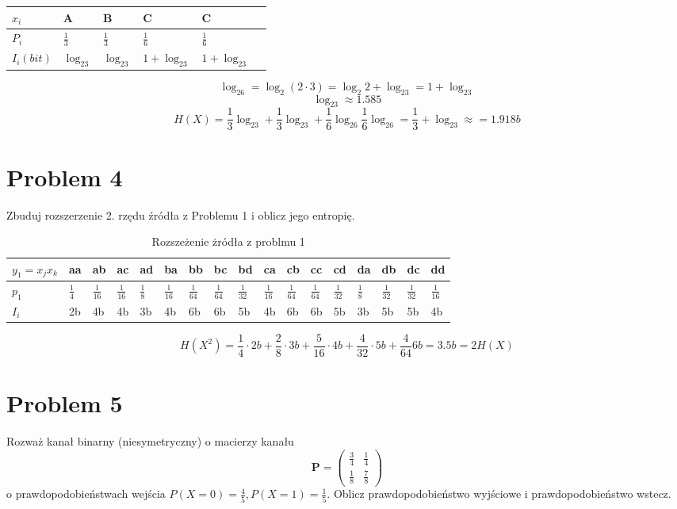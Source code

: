 \documentclass[12pt]{article}
\begin{document}
\begin{table}[h]
\begin{tabular}{l|lllll}
\hline \hline
$x_i$ & A   & B   & C   & C   \\ \hline
$P_i$ & $\frac{1}{3}$ & $\frac{1}{3}$ &$\frac{1}{6}$& $\frac{1}{6}$\\ 
$I_i(bit)$ & $\log_23$  & $\log_23$  & $1+\log_23$  & $1+\log_23$ \\  \hline \hline
\end{tabular}

\end{table}
$$\log_26 = \log_2(2\cdot 3)=\log_2 2 + \log_23 = 1 + \log_23 $$
$$\log_23 \approx 1.585 $$
$$ H(X) =\frac{1}{3}\log_23 + \frac{1}{3}\log_23 + \frac{1}{6}\log_26 \frac{1}{6}\log_26 =\frac{1}{3} + \log_23 \approx = 1.918b $$

\section*{Problem 4}

Zbuduj rozszerzenie 2. rzędu źródła z Problemu 1 i oblicz jego entropię.

\begin{table}[h]
\hspace*{-1.5cm}
\begin{tabular}{|l|l|l|l|l|l|l|l|l|l|l|l|l|l|l|l|l|}
\hline
$y_1=x_j x_k$ & aa  & ab   & ac   & ad  & ba   & bb   & bc   & bd   & ca   & cb   & cc   & cd   & da  & db   & dc   & dd   \\ \hline
    $p_1$        & $\frac{1}{4}$ & $\frac{1}{16}$ & $\frac{1}{16}$ & $\frac{1}{8}$ & $\frac{1}{16}$ & $\frac{1}{64}$ & $\frac{1}{64}$ & $\frac{1}{32}$ & $\frac{1}{16}$ & $\frac{1}{64}$ & $\frac{1}{64}$ & $\frac{1}{32}$ & $\frac{1}{8}$ & $\frac{1}{32}$ & $\frac{1}{32}$ & $\frac{1}{16}$ \\[0.4em] \hline
$I_i $     & 2b  & 4b   & 4b   & 3b  & 4b   & 6b   & 6b   & 5b   & 4b   & 6b   & 6b   & 5b   & 3b  & 5b   & 5b   & 4b   \\ \hline
\end{tabular}
\caption{Rozszeżenie żródła z problmu 1}
\end{table}

$$H(X^2) = \frac{1}{4}\cdot 2b+\frac{2}{8}\cdot 3b + \frac{5}{16}\cdot 4b + \frac{4}{32} \cdot 5b + 
\frac{4}{64} 6b =3.5b = 2H(X)  $$

\section*{Problem 5}
Rozważ kanał binarny (niesymetryczny) o macierzy kanału
$$ \mathbf{P}= 
\begin{pmatrix}
    \frac{3}{4} & \frac{1}{4} \\
    \frac{1}{8} & \frac{7}{8} 
\end{pmatrix}
$$
o prawdopodobieństwach wejścia $P(X = 0) = \frac{4}{5}, P(X = 1)=\frac{1}{5}$. 
Oblicz prawdopodobieństwo wyjściowe i prawdopodobieństwo wstecz. 
\end{document}
